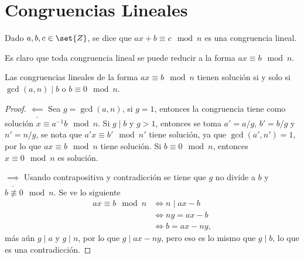 \documentclass{ayudantia}
\begin{document}
\section{Congruencias Lineales}
\begin{defn}
    Dado \(a,b,c\in\set{Z}\), se dice que \(ax+b\equiv c\mod n\) es una congruencia lineal.
\end{defn}
\begin{remark}
    Es claro que toda congruencia lineal se puede reducir a la forma \(ax\equiv b\mod n\).
\end{remark}
\begin{thm}
    Las congruencias lineales de la forma \(ax\equiv b\mod n\) tienen solución si y solo si \(\gcd(a,n)\mid b\) o \(b\equiv 0\mod n\).
\end{thm}
\begin{proof}
    \(\underline{\impliedby }\) Sea \(g=\gcd(a,n)\), si \(g=1\), entonces la congruencia tiene como solución \(x\equiv a^{-1}b\mod n\). Si \(g\mid b\) y \(g>1\), entonces se toma \(a'=a/g\), \(b'=b/g\) y \(n'=n/g\), se nota que \(a'x\equiv b'\mod n'\) tiene solución, ya que \(\gcd(a',n')=1\), por lo que \(ax\equiv b\mod n\) tiene solución. Si \(b\equiv 0\mod n\), entonces \(x\equiv0\mod n\) es solución.

    \(\underline{\implies}\) Usando contrapositiva y contradicción se tiene que \(g\) no divide a \(b\) y \(b\not\equiv 0\mod n\). Se ve lo siguiente
    \begin{align*}
        ax\equiv b\mod n&\iff n\mid ax-b\\
        &\iff ny=ax-b\\
        &\iff b=ax-ny,
    \end{align*}
    más aún \(g\mid a\) y \(g\mid n\), por lo que \(g\mid ax-ny\), pero eso es lo mismo que \(g\mid b\), lo que es una contradicción.
\end{proof}
\end{document}
